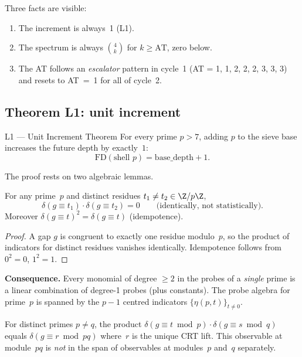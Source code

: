\documentclass[12pt,a4paper]{article}
\begin{document}
Three facts are visible:
\begin{enumerate}[nosep]
  \item The increment is always~1 (L1).
  \item The spectrum is always $\binom{4}{k}$ for $k \ge \mathrm{AT}$, zero below.
  \item The AT follows an \emph{escalator} pattern in cycle~1 (AT = 1, 1, 2, 2,
    2, 3, 3, 3) and resets to AT~=~1 for all of cycle~2.
\end{enumerate}


\subsection{Theorem L1: unit increment}
\label{sec:PM_L1}

\begin{thmbox}{L1 --- Unit Increment Theorem}
\label{thm:L1}
For every prime $p > 7$, adding $p$ to the sieve base increases the future
depth by exactly~$1$:
\[
  \mathrm{FD}(\text{shell } p) = \mathrm{base\_depth} + 1.
\]
\end{thmbox}

The proof rests on two algebraic lemmas. \mTHM

\begin{lemma}
\label{lem:indicator_sat}
For any prime~$p$ and distinct residues $t_1 \ne t_2 \in \Z/p\Z$,
\[
  \delta(g \equiv t_1) \cdot \delta(g \equiv t_2) = 0
  \qquad\text{(identically, not statistically).}
\]
Moreover $\delta(g \equiv t)^2 = \delta(g \equiv t)$ (idempotence).
\end{lemma}

\begin{proof}
A gap $g$ is congruent to exactly one residue modulo~$p$, so the product of
indicators for distinct residues vanishes identically.  Idempotence follows
from $0^2 = 0$, $1^2 = 1$.
\end{proof}

\noindent
\textbf{Consequence.}  Every monomial of degree $\ge 2$ in the probes of a
\emph{single} prime is a linear combination of degree-1 probes (plus
constants).  The probe algebra for prime~$p$ is spanned by the $p{-}1$
centred indicators $\{\eta(p, t)\}_{t \ne 0}$.

\begin{lemma}
\label{lem:CRT_irred}
For distinct primes $p \ne q$, the product $\delta(g \equiv t \bmod p) \cdot
\delta(g \equiv s \bmod q)$ equals $\delta(g \equiv r \bmod pq)$ where~$r$ is
the unique CRT lift.  This observable at module~$pq$ is \emph{not} in the span
of observables at modules~$p$ and~$q$ separately.
\end{lemma}
\end{document}
